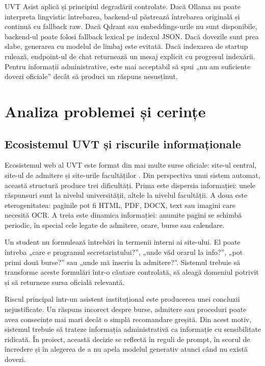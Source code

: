\documentclass[12pt,a4paper]{report}
\theoremstyle{definition}
\theoremstyle{remark}
\begin{document}
UVT Asist aplică și principiul degradării controlate. Dacă Ollama nu poate interpreta lingvistic întrebarea, backend-ul păstrează întrebarea originală și continuă cu fallback raw. Dacă Qdrant sau embeddings-urile nu sunt disponibile, backend-ul poate folosi fallback lexical pe indexul JSON. Dacă dovezile sunt prea slabe, generarea cu modelul de limbaj este evitată. Dacă indexarea de startup rulează, endpoint-ul de chat returnează un mesaj explicit cu progresul indexării. Pentru informații administrative, este mai acceptabil să spui „nu am suficiente dovezi oficiale” decât să produci un răspuns nesusținut.

\chapter{Analiza problemei și cerințe}

\section{Ecosistemul UVT și riscurile informaționale}
Ecosistemul web al UVT este format din mai multe surse oficiale: site-ul central, site-ul de admitere și site-urile facultăților \cite{UVTWebsite,UVTAdmissionWebsite}. Din perspectiva unui sistem automat, această structură produce trei dificultăți. Prima este dispersia informației: unele răspunsuri sunt la nivelul universității, altele la nivelul facultății. A doua este eterogenitatea: paginile pot fi HTML, PDF, DOCX, text sau imagini care necesită OCR. A treia este dinamica informației: anumite pagini se schimbă periodic, în special cele legate de admitere, orare, burse sau calendare.

Un student nu formulează întrebări în termenii interni ai site-ului. El poate întreba „care e programul secretariatului?”, „unde văd orarul la info?”, „pot primi două burse?” sau „unde mă înscriu la admitere?”. Sistemul trebuie să transforme aceste formulări într-o căutare controlată, să aleagă domeniul potrivit și să returneze sursa oficială relevantă.

Riscul principal într-un asistent instituțional este producerea unei concluzii nejustificate. Un răspuns incorect despre burse, admitere sau proceduri poate avea consecințe mai mari decât o simplă recomandare greșită. Din acest motiv, sistemul trebuie să trateze informația administrativă ca informație cu sensibilitate ridicată. În proiect, această decizie se reflectă în reguli de prompt, în scorul de încredere și în alegerea de a nu apela modelul generativ atunci când nu există dovezi.
\end{document}
